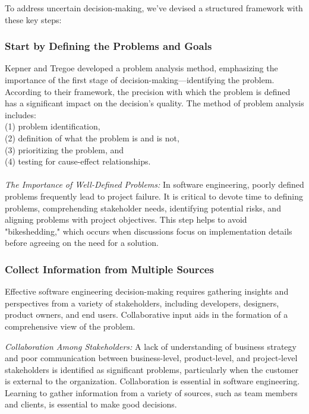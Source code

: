 \documentclass{article}
\begin{document}
To address uncertain decision-making, we've devised a structured framework with these key steps:
\subsubsection{Start by Defining the Problems and Goals}
Kepner and Tregoe developed a problem analysis method, emphasizing the importance of the first stage of decision-making—identifying the problem. According to their framework, the precision with which the problem is defined has a significant impact on the decision's quality\cite{lunenburg2010decision}. The method of problem analysis includes: 
\\(1) problem identification,\\(2) definition of what the problem is and is not,\\ (3) prioritizing the problem, and \\(4) testing for cause-effect relationships.
\\
\\\textit{The Importance of Well-Defined Problems:} In software engineering, poorly defined problems frequently lead to project failure. It is critical to devote time to defining problems, comprehending stakeholder needs, identifying potential risks, and aligning problems with project objectives. This step helps to avoid "bikeshedding," which occurs when discussions focus on implementation details before agreeing on the need for a solution.



\subsubsection{Collect Information from Multiple Sources}
Effective software engineering decision-making requires gathering insights and perspectives from a variety of stakeholders, including developers, designers, product owners, and end users. Collaborative input aids in the formation of a comprehensive view of the problem.

\textit{Collaboration Among Stakeholders:} A lack of understanding of business strategy and poor communication between business-level, product-level, and project-level stakeholders is identified as significant problems, particularly when the customer is external to the organization.\cite{CUNHA2016947}
Collaboration is essential in software engineering. Learning to gather information from a variety of sources, such as team members and clients, is essential to make good decisions.
\end{document}
